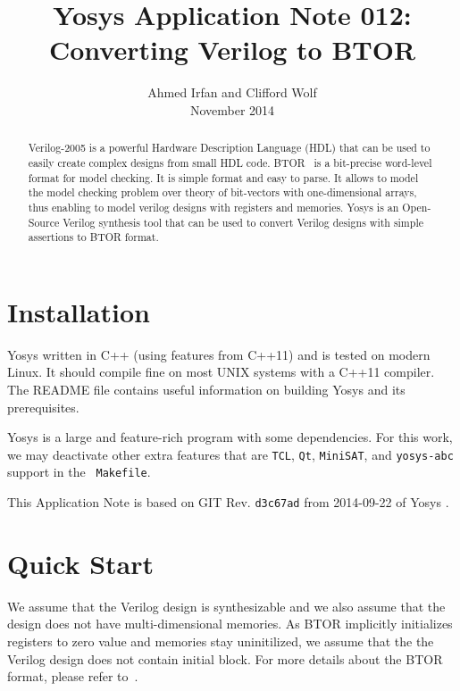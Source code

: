 \documentclass[9pt,technote,a4paper]{IEEEtran}
\begin{document}
\title{Yosys Application Note 012: \\ Converting Verilog to BTOR}
\author{Ahmed Irfan and Clifford Wolf \\ November 2014}
\maketitle

\begin{abstract}
Verilog-2005 is a powerful Hardware Description Language (HDL) that
can be used to easily create complex designs from small HDL code.
BTOR~\cite{btor} is a bit-precise word-level format for model
checking.  It is simple format and easy to parse.  It allows to model
the model checking problem over theory of bit-vectors with
one-dimensional arrays, thus enabling to model verilog designs with
registers and memories.  Yosys \cite{yosys} is an Open-Source Verilog
synthesis tool that can be used to convert Verilog designs with simple
assertions to BTOR format.

\end{abstract}

\section{Installation}

Yosys written in C++ (using features from C++11) and is tested on
modern Linux.  It should compile fine on most UNIX systems with a
C++11 compiler. The README file contains useful information on
building Yosys and its prerequisites.

Yosys is a large and feature-rich program with some dependencies. For
this work, we may deactivate other extra features that are {\tt TCL},
{\tt Qt}, {\tt MiniSAT}, and {\tt yosys-abc} support in the {\tt
  Makefile}.

\bigskip

This Application Note is based on GIT Rev. {\tt d3c67ad} from
2014-09-22 of Yosys \cite{yosys}.

\section{Quick Start}

We assume that the Verilog design is synthesizable and we also assume
that the design does not have multi-dimensional memories.  As BTOR
implicitly initializes registers to zero value and memories stay
uninitilized, we assume that the the Verilog design does
not contain initial block. For more details about the BTOR format,
please refer to~\cite{btor}.
\end{document}
